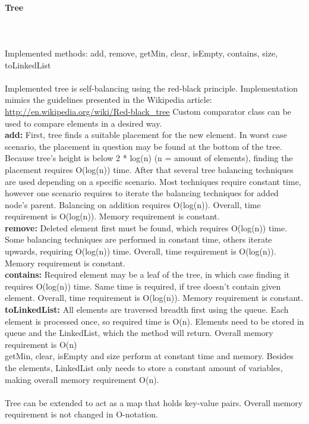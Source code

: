 \documentclass[a4paper,12pt]{article}
\begin{document}
\paragraph{\large Tree} \hspace{0pt} \\
\\
Implemented methods: add, remove, getMin, clear, isEmpty, contains, size, toLinkedList\\
\\
Implemented tree is self-balancing using the red-black principle. Implementation mimics the guidelines presented in the Wikipedia article: \url{http://en.wikipedia.org/wiki/Red-black_tree} Custom comparator class can be used to compare elements in a desired way.\\

\textbf{add:} First, tree finds a suitable placement for the new element. In worst case scenario, the placement in question may be found at the bottom of the tree. Because tree's height is below 2 * log(n) (n = amount of elements), finding the placement requires O(log(n)) time. After that several tree balancing techniques are used depending on a specific scenario. Most techniques require constant time, however one scenario requires to iterate the balancing techniques for added node's parent. Balancing on addition requires O(log(n)). Overall, time requirement is O(log(n)). Memory requirement is constant.
\\

\textbf{remove:} Deleted element first must be found, which requires O(log(n)) time. Some balancing techniques are performed in constant time, others iterate upwards, requiring O(log(n)) time.  Overall, time requirement is O(log(n)). Memory requirement is constant.
\\

\textbf{contains:} Required element may be a leaf of the tree, in which case finding it requires O(log(n)) time. Same time is required, if tree doesn't contain given element. Overall, time requirement is O(log(n)). Memory requirement is constant.
\\

\textbf{toLinkedList:} All elements are traversed breadth first using the queue. Each element is processed once, so required time is O(n). Elements need to be stored in queue and the LinkedList, which the method will return. Overall memory requirement is O(n)
\\

getMin, clear, isEmpty and size perform at constant time and memory. Besides the elements, LinkedList only needs to store a constant amount of variables, making overall memory requirement O(n).\\
\\
Tree can be extended to act as a map that holds key-value pairs. Overall memory requirement is not changed in O-notation.\\
\end{document}
